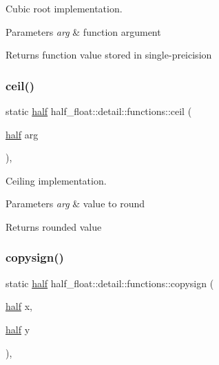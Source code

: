 Cubic root implementation. 
\begin{DoxyParams}{Parameters}
{\em arg} & function argument \\
\hline
\end{DoxyParams}
\begin{DoxyReturn}{Returns}
function value stored in single-\/preicision 
\end{DoxyReturn}
\mbox{\label{structhalf__float_1_1detail_1_1functions_a9ba7383bbc00cd9d4ff2a3c3649f501a}} 
\subsubsection{\texorpdfstring{ceil()}{ceil()}}
{\footnotesize\ttfamily static \hyperlink{classhalf__float_1_1half}{half} half\+\_\+float\+::detail\+::functions\+::ceil (\begin{DoxyParamCaption}\item[{\hyperlink{classhalf__float_1_1half}{half}}]{arg }\end{DoxyParamCaption})\hspace{0.3cm}{\ttfamily [inline]}, {\ttfamily [static]}}

Ceiling implementation. 
\begin{DoxyParams}{Parameters}
{\em arg} & value to round \\
\hline
\end{DoxyParams}
\begin{DoxyReturn}{Returns}
rounded value 
\end{DoxyReturn}
\mbox{\label{structhalf__float_1_1detail_1_1functions_acd23a9057b257a6871f5599ee98a61df}} 
\subsubsection{\texorpdfstring{copysign()}{copysign()}}
{\footnotesize\ttfamily static \hyperlink{classhalf__float_1_1half}{half} half\+\_\+float\+::detail\+::functions\+::copysign (\begin{DoxyParamCaption}\item[{\hyperlink{classhalf__float_1_1half}{half}}]{x,  }\item[{\hyperlink{classhalf__float_1_1half}{half}}]{y }\end{DoxyParamCaption})\hspace{0.3cm}{\ttfamily [inline]}, {\ttfamily [static]}}

